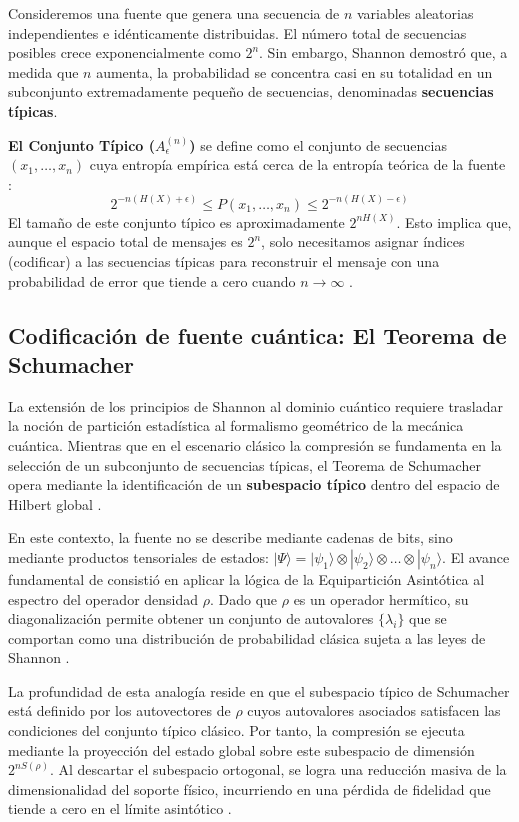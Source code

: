 \documentclass[11pt,a4paper,spanish]{book}
\begin{document}
Consideremos una fuente que genera una secuencia de $n$ variables aleatorias independientes e idénticamente distribuidas. El número total de secuencias posibles crece exponencialmente como $2^n$. Sin embargo, Shannon demostró que, a medida que $n$ aumenta, la probabilidad se concentra casi en su totalidad en un subconjunto extremadamente pequeño de secuencias, denominadas \textbf{secuencias típicas}.

\textbf{El Conjunto Típico ($A_\epsilon^{(n)}$)} se define como el conjunto de secuencias $(x_1, \dots, x_n)$ cuya entropía empírica está cerca de la entropía teórica de la fuente \citep{shannon1948}:
\begin{equation}
    2^{-n(H(X) + \epsilon)} \leq P(x_1, \dots, x_n) \leq 2^{-n(H(X) - \epsilon)}
\end{equation}
El tamaño de este conjunto típico es aproximadamente $2^{nH(X)}$. Esto implica que, aunque el espacio total de mensajes es $2^n$, solo necesitamos asignar índices (codificar) a las secuencias típicas para reconstruir el mensaje con una probabilidad de error que tiende a cero cuando $n \to \infty$ \citep{fano1961}.

\subsection{Codificación de fuente cuántica: El Teorema de Schumacher}

La extensión de los principios de Shannon al dominio cuántico requiere trasladar la noción de partición estadística al formalismo geométrico de la mecánica cuántica. Mientras que en el escenario clásico la compresión se fundamenta en la selección de un subconjunto de secuencias típicas, el Teorema de Schumacher opera mediante la identificación de un \textbf{subespacio típico} dentro del espacio de Hilbert global \citep{schumacher1995}.

En este contexto, la fuente no se describe mediante cadenas de bits, sino mediante productos tensoriales de estados: $|\Psi\rangle = |\psi_1\rangle \otimes |\psi_2\rangle \otimes \dots \otimes |\psi_n\rangle$. El avance fundamental de \citet{schumacher1995} consistió en aplicar la lógica de la Equipartición Asintótica al espectro del operador densidad $\rho$. Dado que $\rho$ es un operador hermítico, su diagonalización permite obtener un conjunto de autovalores $\{\lambda_i\}$ que se comportan como una distribución de probabilidad clásica sujeta a las leyes de Shannon \citep{vonneumann1932}.

La profundidad de esta analogía reside en que el subespacio típico de Schumacher está definido por los autovectores de $\rho$ cuyos autovalores asociados satisfacen las condiciones del conjunto típico clásico. Por tanto, la compresión se ejecuta mediante la proyección del estado global sobre este subespacio de dimensión $2^{nS(\rho)}$. Al descartar el subespacio ortogonal, se logra una reducción masiva de la dimensionalidad del soporte físico, incurriendo en una pérdida de fidelidad que tiende a cero en el límite asintótico \citep{schumacher1995, jozsa1994}.
\end{document}
